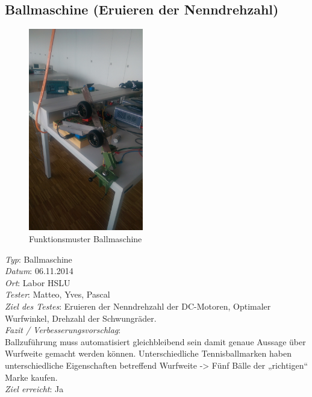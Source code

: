 
\subsection{Ballmaschine (Eruieren der Nenndrehzahl)}
\begin{figure}[h!]
	\includegraphics[width=5cm]{Funktionstests/Bilder/Ballmaschine_Drehzahl1.jpg}
	\centering
	\caption{Funktionsmuster Ballmaschine} 
\label{abb:Ballmaschine_Drehzahl}
\end{figure}	
\textit{Typ}: Ballmaschine \\ 
\textit{Datum}: 06.11.2014   \\
\textit{Ort}: Labor HSLU \\
\textit{Tester}: Matteo, Yves, Pascal \\
\textit{Ziel des Testes}:  Eruieren der Nenndrehzahl der DC-Motoren, Optimaler Wurfwinkel, Drehzahl der Schwungräder.  \\
\textit{Fazit / Verbesserungsvorschlag}: \\
Ballzuführung muss automatisiert gleichbleibend sein damit genaue Aussage über Wurfweite gemacht werden können. 
Unterschiedliche Tennisballmarken haben unterschiedliche Eigenschaften betreffend Wurfweite -> Fünf Bälle der „richtigen“ Marke kaufen. \\
\textit{Ziel erreicht}: Ja
